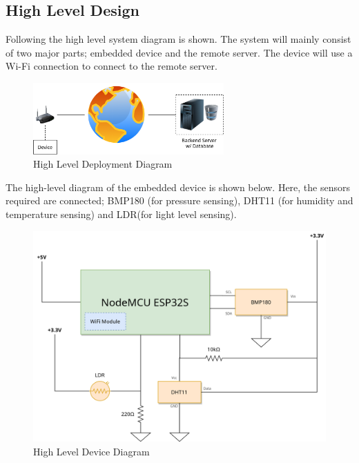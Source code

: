 \documentclass[12pt,a4paper]{article}
\begin{document}

\subsection{High Level Design}

Following the high level system diagram is shown.
The system will mainly consist of two major parts; embedded device and the remote server.
The device will use a Wi-Fi connection to connect to the remote server.

\begin{figure}[h]
    \centering
    \includegraphics[width=0.65\textwidth]{./images/high-level-1.png}
    \caption{High Level Deployment Diagram}
\end{figure}

The high-level diagram of the embedded device is shown below.
Here, the sensors required are connected; BMP180 (for pressure sensing),
DHT11 (for humidity and temperature sensing) and LDR(for light level sensing).

\begin{figure}[h]
    \centering
    \includegraphics[width=\textwidth]{./images/high-level-2.png}
    \caption{High Level Device Diagram}
\end{figure}
\end{document}
